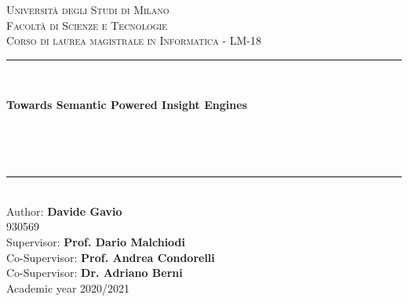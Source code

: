 \documentclass[\main/main.tex]{subfiles}
\begin{document}
\pagestyle{empty} %
\begin{titlepage}
	\begin{center}
		\vfill
		{\large \scshape Università degli Studi di Milano}\\[0.1cm]
		{\large \scshape Facoltà di Scienze e Tecnologie}\\[0.1cm]
		{\large \scshape Corso di laurea magistrale in Informatica - LM-18}\\[0.5cm]
		\rule{\textwidth}{1.5pt}\\[0cm]
		{\huge \bfseries  Towards Semantic Powered Insight Engines \par \ }\\[-0.5cm]
		\rule{\textwidth}{1.5pt}\\[2.5cm]
		{\hfill \large Author: \textbf{Davide Gavio}} \\
		\vspace{0.1cm}
		{\hfill \large 930569} \\
		\vspace{0.5cm}
		{\hfill \large Supervisor: \textbf{Prof. Dario Malchiodi}} \\
	    {\hfill \large Co-Supervisor: \textbf{Prof. Andrea Condorelli} \\}
	    {\hfill \large Co-Supervisor: \textbf{Dr. Adriano Berni} \\}
	    \vspace{1cm}
		\hfill  Academic year 2020/2021
	\end{center}
\end{titlepage}
\end{document}
